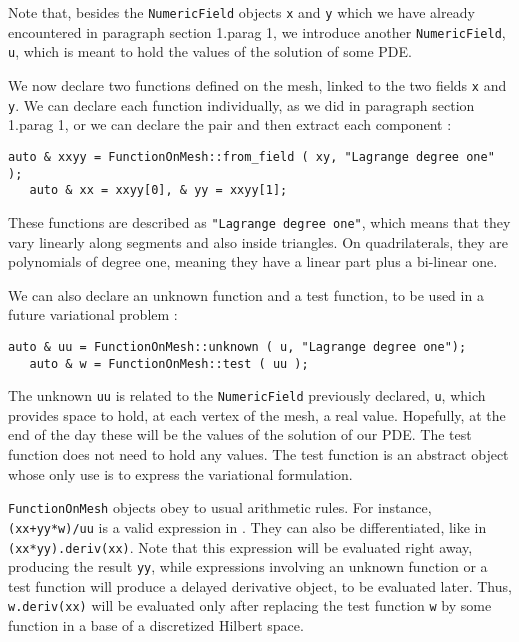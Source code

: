 Note that, besides the {\small\tt NumericField} objects {\small\tt x} and {\small\tt y}
which we have already encountered in paragraph \numb section 1.\numb parag 1,
we introduce another {\small\tt NumericField}, {\small\tt u}, which is meant to hold
the values of the solution of some PDE.

We now declare two functions defined on the mesh, linked to the two fields {\small\tt x} and
{\small\tt y}.
We can declare each function individually, as we did in paragraph \numb section 1.\numb parag 1,
or we can declare the pair and then extract each component :

\begin{Verbatim}[commandchars=\\\{\},formatcom=\small\tt,
   baselinestretch=0.94,framesep=2mm                      ]
   auto & xxyy = FunctionOnMesh::from_field ( xy, "Lagrange degree one" );
   auto & xx = xxyy[0], & yy = xxyy[1];
\end{Verbatim}

These functions are described as {\small\tt "Lagrange degree one"}, which means that they vary
linearly along segments and also inside triangles.
On quadrilaterals, they are polynomials of degree one, meaning they have a linear part plus
a bi-linear one.

We can also declare an unknown function and a test function, to be used in a future variational
problem :

\begin{Verbatim}[commandchars=\\\{\},formatcom=\small\tt,
   baselinestretch=0.94,framesep=2mm                      ]
   auto & uu = FunctionOnMesh::unknown ( u, "Lagrange degree one");
   auto & w = FunctionOnMesh::test ( uu );
\end{Verbatim}

The unknown {\small\tt uu} is related to the {\small\tt NumericField} previously declared,
{\small\tt u}, which provides space to hold, at each vertex of the mesh, a real value.
Hopefully, at the end of the day these will be the values of the solution of our PDE.
The test function does not need to hold any values.
The test function is an abstract object whose only use is to express the
variational formulation.

{\small\tt FunctionOnMesh} objects obey to usual arithmetic rules.
For instance, {\small\tt (xx+yy*w)/uu} is a valid expression in \maniFEM.
They can also be differentiated, like in {\small\tt (xx*yy).deriv(xx)}.
Note that this expression will be evaluated right away, producing the result
{\small\tt yy}, while expressions involving an unknown function or a test function
will produce a delayed derivative object, to be evaluated later.
Thus, {\small\tt w.deriv(xx)} will be evaluated only after replacing the test function
{\small\tt w} by some function in a base of a discretized Hilbert space.

